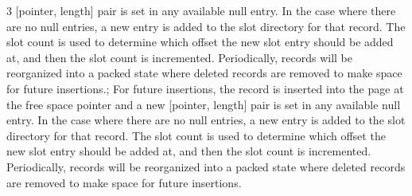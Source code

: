 \documentclass[10pt,landscape]{article}
\begin{document}
\begin{multicols*}{3}
[pointer, length] pair is set in any available null entry. In the case where there are no null entries, a
new entry is added to the slot directory for that record. The slot count is used to determine which
offset the new slot entry should be added at, and then the slot count is incremented. Periodically,
records will be reorganized into a packed state where deleted records are removed to make space
for future insertions.; For future insertions, the record is inserted into the page at the free space pointer and a new
[pointer, length] pair is set in any available null entry. In the case where there are no null entries, a
new entry is added to the slot directory for that record. The slot count is used to determine which
offset the new slot entry should be added at, and then the slot count is incremented. Periodically,
records will be reorganized into a packed state where deleted records are removed to make space
for future insertions.





\end{multicols*}
\end{document}
